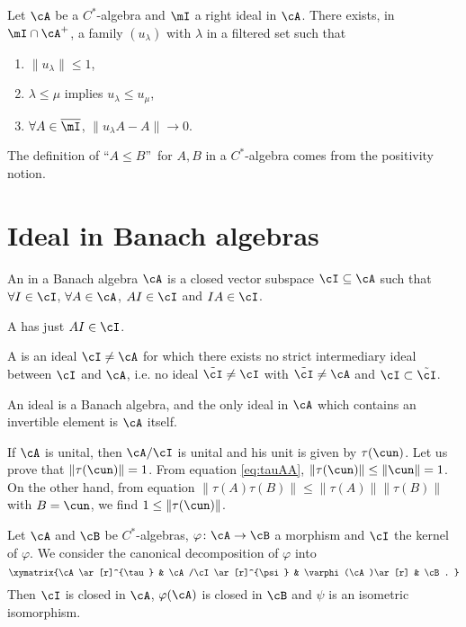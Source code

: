 \begin{proposition}
	Let $\cA$ be a $C^{*}$-algebra and $\mI$ a right ideal in $\cA$. There exists, in $\mI\cap\cA^+$, a family $(u_{\lambda})$ with $\lambda$ in a filtered set such that
	\begin{enumerate}
		\item $\|u_{\lambda}\|\leq 1$,
		\item $\lambda\leq\mu$ implies $u_{\lambda}\leq u_{\mu}$,
		\item $\forall A\in\overline{\mI}$, $\|u_{\lambda} A-A\|\to 0$.
	\end{enumerate}
\end{proposition}

The definition of ``$A\leq B$''\ for $A,B$ in a $C^{*}$-algebra comes from the positivity notion.


\section{Ideal in Banach algebras}

\begin{definition}
	An  in a Banach algebra $\cA$ is a closed vector subspace $\cI\subseteq\cA$ such that $\forall I\in\cI$, $\forall A\in\cA$, $AI\in\cI$ and $IA\in\cI$.

	A  has just $AI\in\cI$.

	A   is an ideal $\cI\neq\cA$ for which there exists no strict intermediary ideal between $\cI$ and $\cA$, i.e. no ideal $\tilde{\cI}\neq\cI$  with $\tilde{\cI}\neq\cA$ and $\cI\subset\tilde{\cI}$.
\end{definition}

An ideal is a Banach algebra, and the only ideal in $\cA$ which contains an invertible element is $\cA$ itself.

If $\cA$ is unital, then $\cA/\cI$ is unital and his unit is given by $\tau(\cun)$. Let us prove that $\|\tau(\cun)\|=1$. From equation \eqref{eq:tauAA}, $\|\tau(\cun)\|\leq\|\cun\|=1$. On the other hand, from equation $\|\tau(A)\tau(B)\|\leq\|\tau(A)\|\|\tau(B)\|$ with $B=\cun$, we find $1\leq\|\tau(\cun)\|$.

\begin{corollary}
	Let $\cA$ and $\cB$ be $C^*$-algebras, $\varphi\colon \cA\to \cB$ a morphism and $\cI$ the kernel of $\varphi$. We consider the canonical decomposition of $\varphi$ into
	\begin{equation}
		\xymatrix{%
			\cA \ar[r]^{\tau}    & \cA/\cI\ar[r]^{\psi}  & \varphi(\cA)\ar[r]    & \cB.
		}
	\end{equation}
	Then $\cI$ is closed in $\cA$, $\varphi(\cA)$ is closed in $\cB$ and $\psi$ is an isometric isomorphism.
\end{corollary}

